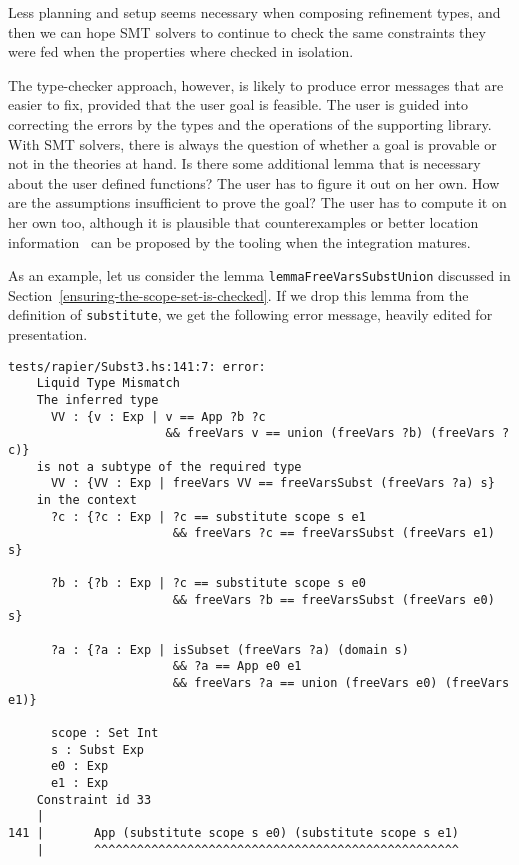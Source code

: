 \documentclass[sigconf, anonymous, review]{acmart}
\newcommand{\tc}[1]{{\small\texttt{#1}}}
\begin{document}
Less planning and setup seems necessary when composing refinement types, and
then we can hope SMT solvers to continue to check the same constraints
they were fed when the properties where checked in isolation.

The type-checker approach, however, is likely to produce error messages that
are easier to fix, provided that the user goal is feasible.
The user is guided into correcting the errors
by the types and the operations of the supporting library. With SMT solvers,
there is always the question of whether a goal is provable or not in the
theories at hand. Is there some additional lemma that is necessary about the user defined
functions? The user has to figure it out on her own. How are the assumptions
insufficient to prove the goal? The user has to compute it on her own too,
although it is plausible that counterexamples or better location information~\cite{webbers24}
can be proposed by the tooling when the integration matures.

As an example, let us consider the lemma \tc{lemma\-FreeVars\-Subst\-Union} discussed in
Section~\ref{ensuring-the-scope-set-is-checked}.
If we drop this lemma from the definition of \tc{substitute}, we get the following
error message, heavily edited for presentation.

\begin{verbatim}
tests/rapier/Subst3.hs:141:7: error:
    Liquid Type Mismatch
    The inferred type
      VV : {v : Exp | v == App ?b ?c
                      && freeVars v == union (freeVars ?b) (freeVars ?c)}
    is not a subtype of the required type
      VV : {VV : Exp | freeVars VV == freeVarsSubst (freeVars ?a) s}
    in the context
      ?c : {?c : Exp | ?c == substitute scope s e1
                       && freeVars ?c == freeVarsSubst (freeVars e1) s}

      ?b : {?b : Exp | ?c == substitute scope s e0
                       && freeVars ?b == freeVarsSubst (freeVars e0) s}

      ?a : {?a : Exp | isSubset (freeVars ?a) (domain s)
                       && ?a == App e0 e1
                       && freeVars ?a == union (freeVars e0) (freeVars e1)}

      scope : Set Int
      s : Subst Exp
      e0 : Exp
      e1 : Exp
    Constraint id 33
    |
141 |       App (substitute scope s e0) (substitute scope s e1)
    |       ^^^^^^^^^^^^^^^^^^^^^^^^^^^^^^^^^^^^^^^^^^^^^^^^^^^
\end{verbatim}
\end{document}
